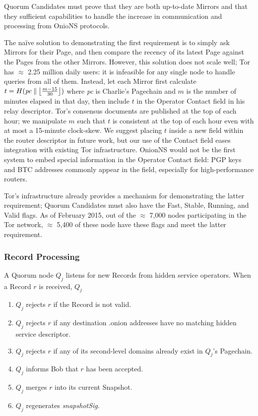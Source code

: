 \documentclass{sig-alternate}
\DeclarePairedDelimiter{\floor}{\lfloor}{\rfloor}
\newcommand*\concat{\mathbin{\|}}
\begin{document}
Quorum Candidates must prove that they are both up-to-date Mirrors and that they sufficient capabilities to handle the increase in communication and processing from OnioNS protocols.

The na\"{i}ve solution to demonstrating the first requirement is to simply ask Mirrors for their Page, and then compare the recency of its latest Page against the Pages from the other Mirrors. However, this solution does not scale well; Tor has $ \approx $ 2.25 million daily users\cite{TorMetrics}: it is infeasible for any single node to handle queries from all of them. Instead, let each Mirror first calculate $ t = H(\mathit{pc} \concat \floor[\big]{\frac{m - 15}{30}}) $ where \emph{pc} is Charlie's Pagechain and $ m $ is the number of minutes elapsed in that day, then include $ t $ in the Operator Contact field in his relay descriptor. Tor's consensus documents are published at the top of each hour; we manipulate $ m $ such that $ t $ is consistent at the top of each hour even with at most a 15-minute clock-skew. We suggest placing $ t $ inside a new field within the router descriptor in future work, but our use of the Contact field eases integration with existing Tor infrastructure. OnionNS would not be the first system to embed special information in the Operator Contact field: PGP keys and BTC addresses commonly appear in the field, especially for high-performance routers.

Tor's infrastructure already provides a mechanism for demonstrating the latter requirement; Quorum Candidates must also have the Fast, Stable, Running, and Valid flags. As of February 2015, out of the $ \approx $ 7,000 nodes participating in the Tor network, $ \approx $ 5,400 of these node have these flags and meet the latter requirement.\cite{TorMetrics}

\subsubsection{Record Processing} %

A Quorum node $ Q_{j} $ listens for new Records from hidden service operators. When a Record $ r $ is received, $ Q_{j} $

\begin{enumerate}[noitemsep]
	\item $ Q_{j} $ rejects $ r $ if the Record is not valid.
	\item $ Q_{j} $ rejects $ r $ if any destination .onion addresses have no matching hidden service descriptor.
	\item $ Q_{j} $ rejects $ r $ if any of its second-level domains already exist in $ Q_{j} $'s Pagechain.
	\item $ Q_{j} $ informs Bob that $ r $ has been accepted.
	\item $ Q_{j} $ merges $ r $ into its current Snapshot.
	\item $ Q_{j} $ regenerates \emph{snapshotSig}.
\end{enumerate}
\end{document}
